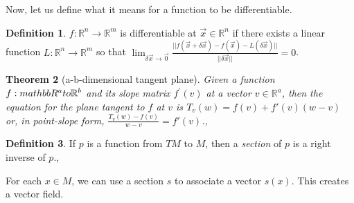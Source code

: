 \documentclass[11pt,leqno,oneside]{amsart}
\newcommand{\R}{{\mathbb R}} %
\newtheorem{thm}{Theorem}[section]
\theoremstyle{definition}
\newtheorem{defn}[thm]{Definition}
\numberwithin{equation}{section}
\begin{document}
Now, let us define what it means for a function to be differentiable.
\begin{defn}
	$f: \R^n \to \R^m$ is differentiable at $\vec{x} \in \R^n$ if there exists
	a linear function $L: \R^n \to \R^m$ so that $\lim_{\delta \vec{x} \to
	\vec{0}} \frac{||f(\vec{x}+\delta \vec{x}) - f(\vec{x}) - L(\delta
	\vec{x})||}{||\delta \vec{x}||} = 0$.
\end{defn}

\begin{thm}[a-b-dimensional tangent plane]
	Given a function $f : \\mathbb{R}^a \\to \mathbb{R}^b$ and its slope matrix $f^\prime(v)$ at a vector $v \in \mathbb{R}^a$, then the equation for the plane tangent to $f$ at $v$ is $T_v(w) = f(v) + f'(v)(w-v)$ or, in point-slope form, $\frac{T_v(w)-f(v)}{w-v} = f'(v)$.,
\end{thm}
\begin{defn}
	If $p$ is a function from $TM$ to $M$, then a \emph{section} of $p$ is a right inverse of $p$.,
\end{defn}

For each $x \in M$, we can use a section $s$ to associate a vector $s(x)$.  This creates a vector field.
\end{document}
